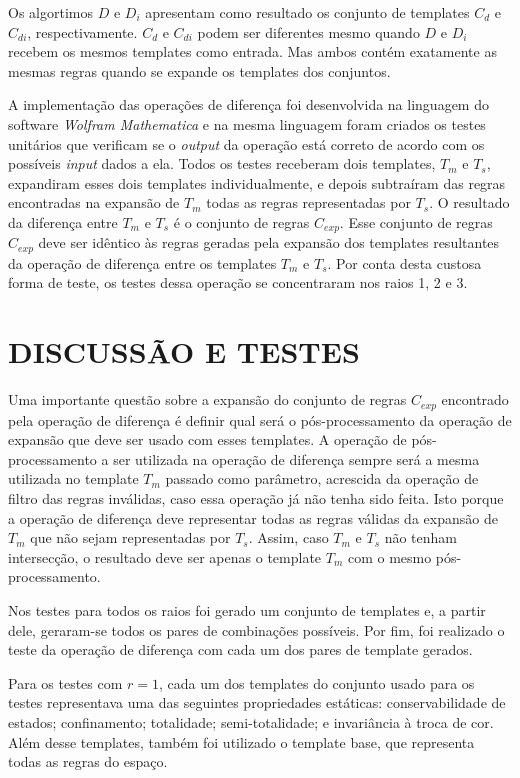 Os algortimos $D$ e $D_i$ apresentam como resultado os conjunto de templates $C_d$ e $C_{di}$, respectivamente. $C_d$ e $C_{di}$ podem ser diferentes mesmo quando $D$ e $D_i$ recebem os mesmos templates como entrada. Mas ambos contém exatamente as mesmas regras quando se expande os templates dos conjuntos.

A implementação das operações de diferença foi desenvolvida na linguagem do software \textit{Wolfram Mathematica} \cite{woframMathematica10} e na mesma linguagem foram criados os testes unitários que verificam se o \textit{output} da operação está correto de acordo com os possíveis \textit{input} dados a ela. Todos os testes receberam dois templates, $T_m$ e $T_s$, expandiram esses dois templates individualmente, e depois subtraíram das regras encontradas na expansão de $T_m$ todas as regras representadas por $T_s$. O resultado da diferença entre $T_m$ e $T_s$ é o conjunto de regras $C_{exp}$. Esse conjunto de regras $C_{exp}$ deve ser idêntico às regras geradas pela expansão dos templates resultantes da operação de diferença entre os templates $T_m$ e $T_s$. Por conta desta custosa forma de teste, os testes dessa operação se concentraram nos raios 1, 2 e 3.

\section{DISCUSSÃO E TESTES}
\label{sec:discussoesETestes}
Uma importante questão sobre a expansão do conjunto de regras $C_{exp}$ encontrado pela operação de diferença é definir qual será o pós-processamento da operação de expansão que deve ser usado com esses templates. A operação de pós-processamento a ser utilizada na operação de diferença sempre será a mesma utilizada no template $T_m$ passado como parâmetro, acrescida da operação de filtro das regras inválidas, caso essa operação já não tenha sido feita. Isto porque a operação de diferença deve representar todas as regras válidas da expansão de $T_m$ que não sejam representadas por $T_s$. Assim, caso $T_m$ e $T_s$ não tenham intersecção, o resultado deve ser apenas o template $T_m$ com o mesmo pós-processamento.



Nos testes para todos os raios foi gerado um conjunto de templates e, a partir dele, geraram-se todos os pares de combinações possíveis. Por fim, foi realizado o teste da operação de diferença com cada um dos pares de template gerados.

Para os testes com $r = 1$, cada um dos templates do conjunto usado para os testes representava uma das seguintes propriedades estáticas: conservabilidade de estados; confinamento; totalidade; semi-totalidade; e invariância  à troca de cor. Além desse templates, também foi utilizado o template base, que representa todas as regras do espaço.

